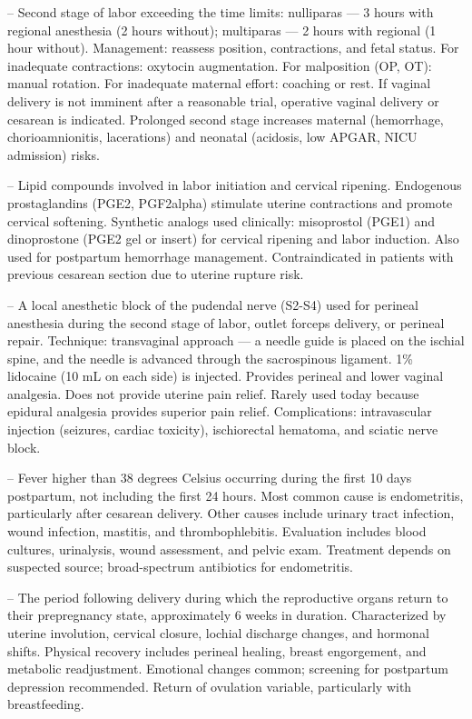 -- Second stage of labor exceeding the time limits: nulliparas — 3 hours with regional anesthesia (2 hours without); multiparas — 2 hours with regional (1 hour without). Management: reassess position, contractions, and fetal status. For inadequate contractions: oxytocin augmentation. For malposition (OP, OT): manual rotation. For inadequate maternal effort: coaching or rest. If vaginal delivery is not imminent after a reasonable trial, operative vaginal delivery or cesarean is indicated. Prolonged second stage increases maternal (hemorrhage, chorioamnionitis, lacerations) and neonatal (acidosis, low APGAR, NICU admission) risks.

-- Lipid compounds involved in labor initiation and cervical ripening. Endogenous prostaglandins (PGE2, PGF2alpha) stimulate uterine contractions and promote cervical softening. Synthetic analogs used clinically: misoprostol (PGE1) and dinoprostone (PGE2 gel or insert) for cervical ripening and labor induction. Also used for postpartum hemorrhage management. Contraindicated in patients with previous cesarean section due to uterine rupture risk.

-- A local anesthetic block of the pudendal nerve (S2-S4) used for perineal anesthesia during the second stage of labor, outlet forceps delivery, or perineal repair. Technique: transvaginal approach — a needle guide is placed on the ischial spine, and the needle is advanced through the sacrospinous ligament. 1\% lidocaine (10 mL on each side) is injected. Provides perineal and lower vaginal analgesia. Does not provide uterine pain relief. Rarely used today because epidural analgesia provides superior pain relief. Complications: intravascular injection (seizures, cardiac toxicity), ischiorectal hematoma, and sciatic nerve block.

-- Fever higher than 38 degrees Celsius occurring during the first 10 days postpartum, not including the first 24 hours. Most common cause is endometritis, particularly after cesarean delivery. Other causes include urinary tract infection, wound infection, mastitis, and thrombophlebitis. Evaluation includes blood cultures, urinalysis, wound assessment, and pelvic exam. Treatment depends on suspected source; broad-spectrum antibiotics for endometritis.

-- The period following delivery during which the reproductive organs return to their prepregnancy state, approximately 6 weeks in duration. Characterized by uterine involution, cervical closure, lochial discharge changes, and hormonal shifts. Physical recovery includes perineal healing, breast engorgement, and metabolic readjustment. Emotional changes common; screening for postpartum depression recommended. Return of ovulation variable, particularly with breastfeeding.

